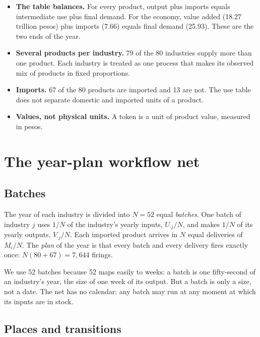 \documentclass[11pt]{article}
\begin{document}
\begin{itemize}[leftmargin=*]
\item \textbf{The table balances.} For every product, output plus imports equals intermediate use plus final demand. For the economy, value added (18.27 trillion pesos) plus imports (7.66) equals final demand (25.93). These are the two ends of the year.
\item \textbf{Several products per industry.} 79 of the 80 industries supply more than one product. Each industry is treated as one process that makes its observed mix of products in fixed proportions.
\item \textbf{Imports.} 67 of the 80 products are imported and 13 are not. The use table does not separate domestic and imported units of a product.
\item \textbf{Values, not physical units.} A token is a unit of product value, measured in pesos.
\end{itemize}

\section{The year-plan workflow net}\label{sec:net}

\subsection{Batches}

The year of each industry is divided into $N=52$ equal \emph{batches}. One batch of industry $j$ uses $1/N$ of the industry's yearly inputs, $U_{\cdot j}/N$, and makes $1/N$ of its yearly outputs, $V_{\cdot j}/N$. Each imported product arrives in $N$ equal deliveries of $M_i/N$. The \emph{plan} of the year is that every batch and every delivery fires exactly once: $N(80+67)=7{,}644$ firings.

We use 52 batches because 52 maps easily to weeks: a batch is one fifty-second of an industry's year, the size of one week of its output. But a batch is only a size, not a date. The net has no calendar: any batch may run at any moment at which its inputs are in stock.

\subsection{Places and transitions}
\end{document}
